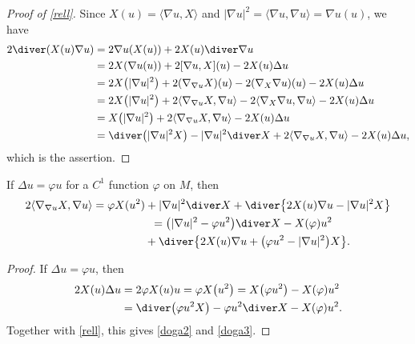 \begin{proof}[Proof of \eqref{rell}]
Since $X(u)=\langle\nabla u, X\rangle$ and $|\nabla u|^2=\langle\nabla u,\nabla u\rangle=\nabla u(u)$, we have
\begin{align*}
 2\diver(X(u)\nabla u)
 &= 2\nabla u(X(u)) + 2X(u)\diver\nabla u \\
 &= 2X(\nabla u(u)) + 2[\nabla u,X](u) - 2X(u)\Delta u \\
 &= 2X\bigl(|\nabla u|^2\bigr) + 2(\nabla_{\nabla u}X)(u) - 2(\nabla_X\nabla u)(u) - 2X(u)\Delta u \\
 &= 2X\bigl(|\nabla u|^2\bigr) + 2\langle\nabla_{\nabla u}X,\nabla u\rangle - 2\langle\nabla_X\nabla u,\nabla u\rangle - 2X(u)\Delta u \\
 &= X\bigl(|\nabla u|^2\bigr) + 2\langle\nabla_{\nabla u}X,\nabla u\rangle - 2X(u)\Delta u \\
 &= \diver\bigl(|\nabla u|^2X\bigr) - |\nabla u|^2\diver X + 2\langle\nabla_{\nabla u}X,\nabla u\rangle - 2X(u)\Delta u,
\end{align*}
which is the assertion.
\end{proof}

\begin{Corollary}%
If $\Delta u=\varphi u$ for a $C^1$ function $\varphi$ on $M$, then
\begin{gather}
 2\langle\nabla_{\nabla u}X,\nabla u\rangle
= \varphi X(u^2) + |\nabla u|^2\diver X + \diver\big\{2X(u)\nabla u-|\nabla u|^2X\big\} \label{doga2} \\
\hphantom{2\langle\nabla_{\nabla u}X,\nabla u\rangle}{}= \bigl(|\nabla u|^2 - \varphi u^2\bigr)\diver X - X(\varphi)u^2 \notag\\
 \hphantom{2\langle\nabla_{\nabla u}X,\nabla u\rangle=}{}+ \diver\big\{2X(u)\nabla u+\bigl(\varphi u^2-|\nabla u|^2\bigr)X\big\}. \label{doga3}
\end{gather}
\end{Corollary}

\begin{proof}
If $\Delta u=\varphi u$, then
\begin{align*}
 2X(u)\Delta u &= 2\varphi X(u)u = \varphi X\bigl(u^2\bigr) = X\bigl(\varphi u^2\bigr) - X(\varphi)u^2 \\
 &= \diver\bigl(\varphi u^2X\bigr) - \varphi u^2\diver X - X(\varphi)u^2.
\end{align*}
Together with \eqref{rell}, this gives \eqref{doga2} and \eqref{doga3}.
\end{proof}
